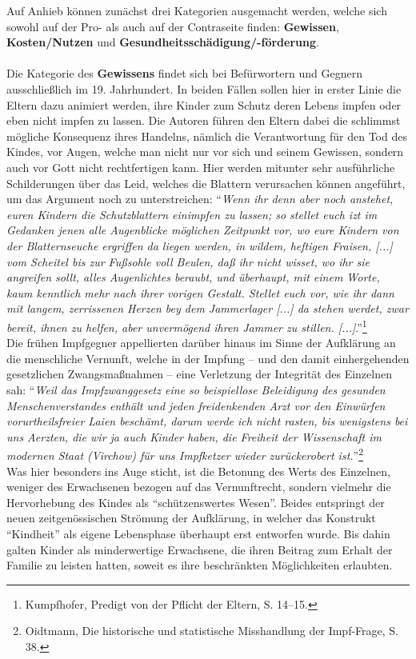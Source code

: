 \documentclass[
    a4paper,
    12pt,
    hyphens,
    chapterprefix=true,
    headheight=33pt,
    footheight=29pt,
    headings=optiontohead, %
]{scrartcl}
\begin{document}
{Auf Anhieb können zunächst drei Kategorien ausgemacht werden, welche sich sowohl auf der Pro- als auch auf der Contraseite finden: \textbf{Gewissen}, \textbf{Kosten/Nutzen} und \textbf{Gesundheitsschädigung/-förderung}.\\
\\
Die Kategorie des \textbf{Gewissens} findet sich bei Befürwortern und Gegnern ausschließlich im 19. Jahrhundert. In beiden Fällen sollen hier in erster Linie die Eltern dazu animiert werden, ihre Kinder zum Schutz deren Lebens impfen oder eben nicht impfen zu lassen. Die Autoren führen den Eltern dabei die schlimmst mögliche Konsequenz ihres Handelns, nämlich die Verantwortung für den Tod des Kindes, vor Augen, welche man nicht nur vor sich und seinem Gewissen, sondern auch vor Gott nicht rechtfertigen kann. Hier werden mitunter sehr ausführliche Schilderungen über das Leid, welches die Blattern verursachen können angeführt, um das Argument noch zu unterstreichen: "`\textit{Wenn ihr denn aber noch anstehet, euren Kindern die Schutzblattern einimpfen zu lassen; so stellet euch izt im Gedanken jenen alle Augenblicke möglichen Zeitpunkt vor, wo eure Kindern von der Blatternseuche ergriffen da liegen werden, in wildem, heftigen Fraisen, [...] vom Scheitel bis zur Fußsohle voll Beulen, daß ihr nicht wisset, wo ihr sie angreifen sollt,  alles Augenlichtes beraubt, und überhaupt, mit einem Worte, kaum kenntlich mehr nach ihrer vorigen Gestalt. Stellet euch vor, wie ihr dann mit langem, zerrissenen Herzen bey dem Jammerlager [...] da stehen werdet, zwar bereit, ihnen zu helfen, aber unvermögend ihren Jammer zu stillen. [...]}."'\footnote{Kumpfhofer, Predigt von der Pflicht der Eltern, S. 14--15.}\\
Die frühen Impfgegner appellierten darüber hinaus im Sinne der Aufklärung an die menschliche Vernunft, welche in der Impfung -- und den damit einhergehenden gesetzlichen Zwangsmaßnahmen -- eine Verletzung der Integrität des Einzelnen sah: "`\textit{Weil das Impfzwanggesetz eine so beispiellose Beleidigung des gesunden Menschenverstandes enthält und jeden freidenkenden Arzt vor den Einwürfen vorurtheilsfreier Laien beschämt, darum werde ich nicht rasten, bis wenigstens bei uns Aerzten, die wir ja auch Kinder haben, die Freiheit der Wissenschaft im modernen Staat (Virchow) für uns Impfketzer wieder zurückerobert ist.}"'\footnote{Oidtmann, Die historische und statistische Misshandlung der Impf-Frage, S. 38.}\\
Was hier besonders ins Auge sticht, ist die Betonung des Werts des Einzelnen, weniger des Erwachsenen bezogen auf das Vernunftrecht, sondern vielmehr die Hervorhebung des Kindes als "`schützenswertes Wesen"'. Beides entspringt der neuen zeitgenössischen Strömung der Aufklärung, in welcher das Konstrukt "`Kindheit"' als eigene Lebensphase überhaupt erst entworfen wurde. Bis dahin galten Kinder als minderwertige Erwachsene, die ihren Beitrag zum Erhalt der Familie zu leisten hatten, soweit es ihre beschränkten Möglichkeiten erlaubten.
}
\end{document}
